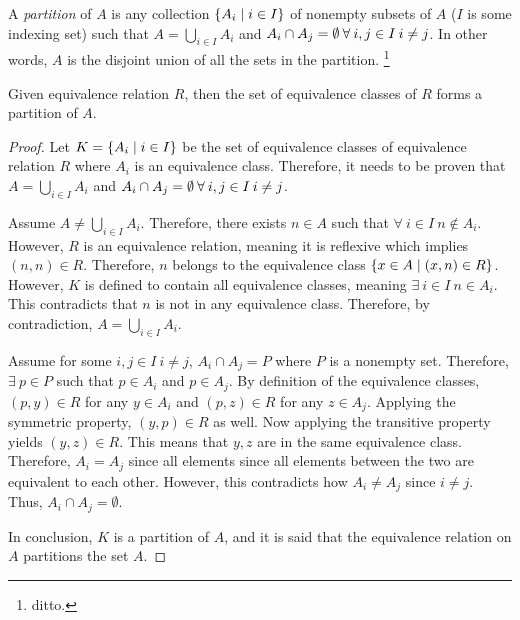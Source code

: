 \bigskip
\begin{definition}
    A \emph{partition} of \(A\) is any collection \(\{A_i\mid i\in I\}\) of nonempty subsets of \(A\) (\(I\) is some indexing set) such that
    \(A=\bigcup_{i\in I}A_i\) and \(A_i\cap A_j=\emptyset\:\forall\: i,j\in I\:i\ne j\). In other words, \(A\) is the disjoint union of all the sets in the partition.
    \footnote{ditto.}
\end{definition}

\bigskip
\begin{proposition}
    Given equivalence relation \(R\), then the set of equivalence classes of \(R\) forms a partition of \(A\).
\end{proposition}
\begin{proof}
    Let \(K=\{A_i\mid i\in I\}\) be the set of equivalence classes of equivalence relation \(R\) where \(A_i\) is an equivalence class. Therefore, it needs to be 
    proven that \(A=\bigcup_{i\in I}A_i\) and \(A_i\cap A_j=\emptyset\:\forall\: i,j\in I\:i\ne j\).

    Assume \(A\ne\bigcup_{i\in I}A_i\). Therefore, there exists \(n\in A\) such that \(\forall\:i\in I\:n\not\in A_i\). However, \(R\) is an equivalence relation, meaning
    it is reflexive which implies \((n,n)\in R\). Therefore, \(n\) belongs to the equivalence class \(\{x\in A\mid(x,n)\in R\}\). However, \(K\) is defined to contain
    all equivalence classes, meaning \(\exists\:i\in I\: n\in A_i\). This contradicts that \(n\) is not in any equivalence class. Therefore, by contradiction,
    \(A=\bigcup_{i\in I}A_i\).
    
    Assume for some \(i,j\in I\:i\ne j\), \(A_i\cap A_j=P\) where \(P\) is a nonempty set. Therefore, \(\exists\:p\in P\) such that \(p\in A_i\) and \(p\in A_j\). By
    definition of the equivalence classes, \((p,y)\in R\) for any \(y\in A_i\) and \((p,z)\in R\) for any \(z\in A_j\). Applying the symmetric property, \((y,p)\in R\)
    as well. Now applying the transitive property yields \((y,z)\in R\). This means that \(y,z\) are in the same equivalence class. Therefore, \(A_i=A_j\) since all elements
    since all elements between the two are equivalent to each other. However, this contradicts how \(A_i\ne A_j\) since \(i\ne j\). Thus, \(A_i\cap A_j=\emptyset\).

    In conclusion, \(K\) is a partition of \(A\), and it is said that the equivalence relation on \(A\) partitions the set \(A\).
\end{proof}

